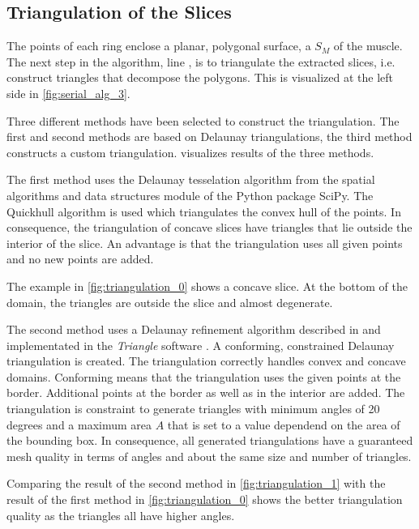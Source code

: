 \subsection{Triangulation of the Slices}
The points of each ring enclose a planar, polygonal surface, a  $S_M$ of the muscle.
The next step in the algorithm, line , is to triangulate the extracted slices, i.e. construct triangles that decompose the polygons. This is visualized at the left side in \cref{fig:serial_alg_3}.

Three different methods have been selected to construct the triangulation. The first and second methods are based on Delaunay triangulations, the third method constructs a custom triangulation.
 visualizes results of the three methods.

The first method uses the Delaunay tesselation algorithm from the spatial algorithms and data structures module of the Python package SciPy. The Quickhull algorithm \cite{quickhull} is used which triangulates the convex hull of the points. In consequence, the triangulation of concave slices have triangles that lie outside the interior of the slice. An advantage is that the triangulation uses all given points and no new points are added.

The example in \cref{fig:triangulation_0} shows a concave slice. At the bottom of the domain, the triangles are outside the slice and almost degenerate.

The second method uses a Delaunay refinement algorithm described in \cite{Delaunay2002} and implementated in the \emph{Triangle} software \cite{shewchuk96b}. A conforming, constrained Delaunay triangulation is created. The triangulation correctly handles convex and concave domains.
Conforming means that the triangulation uses the given points at the border. Additional points at the border as well as in the interior are added. The triangulation is constraint to generate triangles with minimum angles of 20 degrees and a maximum area $A$ that is set to a value dependend on the area of the bounding box. In consequence, all generated triangulations have a guaranteed mesh quality in terms of angles and about the same size and number of triangles.

Comparing the result of the second method in \cref{fig:triangulation_1} with the result of the first method in \cref{fig:triangulation_0} shows the better triangulation quality as the triangles all have higher angles.

